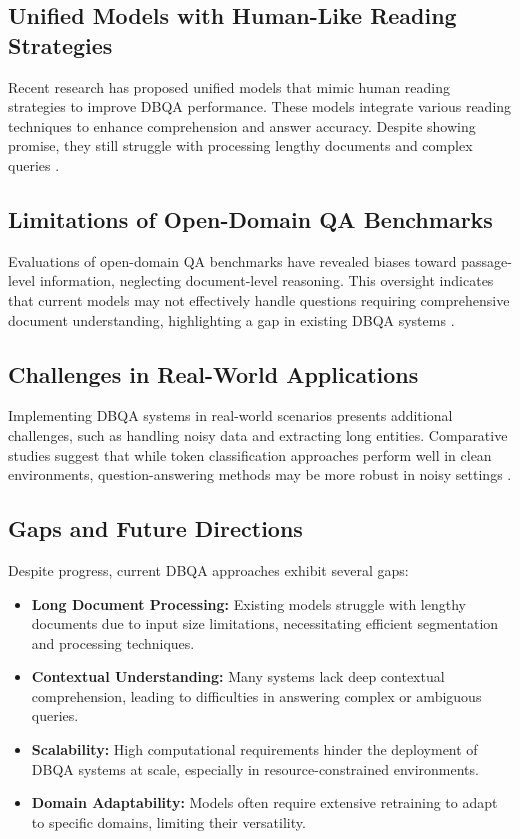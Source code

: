 \documentclass[sigconf]{acmart}
\begin{document}
\subsection{Unified Models with Human-Like Reading Strategies}

Recent research has proposed unified models that mimic human reading strategies to improve DBQA performance. These models integrate various reading techniques to enhance comprehension and answer accuracy. Despite showing promise, they still struggle with processing lengthy documents and complex queries \cite{li2020unified}.

\subsection{Limitations of Open-Domain QA Benchmarks}

Evaluations of open-domain QA benchmarks have revealed biases toward passage-level information, neglecting document-level reasoning. This oversight indicates that current models may not effectively handle questions requiring comprehensive document understanding, highlighting a gap in existing DBQA systems \cite{limitations_open_domain_qa}.

\subsection{Challenges in Real-World Applications}

Implementing DBQA systems in real-world scenarios presents additional challenges, such as handling noisy data and extracting long entities. Comparative studies suggest that while token classification approaches perform well in clean environments, question-answering methods may be more robust in noisy settings \cite{lam2023information}.

\subsection{Gaps and Future Directions}

Despite progress, current DBQA approaches exhibit several gaps:

\begin{itemize}
    \item \textbf{Long Document Processing:} Existing models struggle with lengthy documents due to input size limitations, necessitating efficient segmentation and processing techniques.
    \item \textbf{Contextual Understanding:} Many systems lack deep contextual comprehension, leading to difficulties in answering complex or ambiguous queries.
    \item \textbf{Scalability:} High computational requirements hinder the deployment of DBQA systems at scale, especially in resource-constrained environments.
    \item \textbf{Domain Adaptability:} Models often require extensive retraining to adapt to specific domains, limiting their versatility.
\end{itemize}
\end{document}
